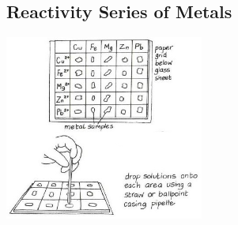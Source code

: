 \begin{multicols}{2}
%
%

\subsection{Reactivity Series of Metals}

\begin{center}
\includegraphics[width=0.49\textwidth]{./img/vso/reactivity-series.jpg}
\end{center}


\end{multicols}

